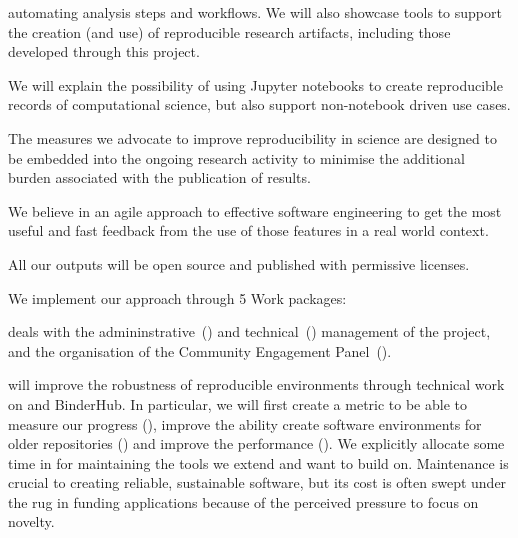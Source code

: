 \begin{compactenum}
  automating analysis steps and workflows.
  We will also showcase tools to support the creation (and use) of reproducible
  research artifacts, including those developed through this project.
\item We will explain the possibility of using Jupyter notebooks to create
  reproducible records of computational science, but also support non-notebook
  driven use cases.
\item The measures we advocate to improve reproducibility in science are
  designed to be embedded into the ongoing research activity to minimise the
  additional burden associated with the publication of results.
\item We believe in an agile approach to effective software engineering to get
  the most useful and fast feedback from the use of those features in a real
  world context.
\item All our outputs will be open source and published with permissive
  licenses.
\end{compactenum}


\medskip
\noindent We implement our approach through 5 Work packages:

{} deals with the admininstrative~()
and technical~() management of the
project, and the organisation of the Community Engagement
Panel~().

     will improve the robustness of reproducible
    environments through technical work on \repotodocker{} and BinderHub. In
    particular, we will first create a metric to be able to measure our progress
    (), improve the ability create
    software environments for older repositories
    () and improve the
    performance (). We
    explicitly allocate some time in  for
    maintaining the tools we extend and want to build on. Maintenance is crucial
    to creating reliable, sustainable software, but its cost is often swept
    under the rug in funding applications because of the perceived pressure to
    focus on novelty.

